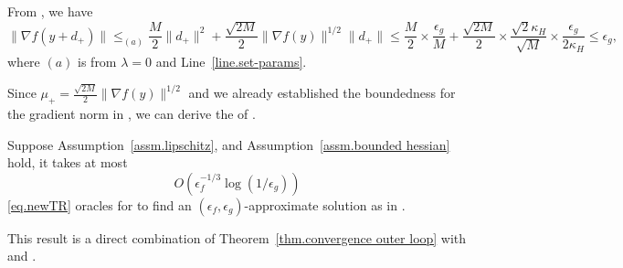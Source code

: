 \documentclass[moor,sglanonrev]{informs4}
\begin{document}
From , we have
\begin{equation*}
    \|\nabla f(y+d_+)\| \leq_{(a)} \frac{M}{2}\|d_+\|^2 + \frac{\sqrt{2M}}{2}\|\nabla f(y)\|^{1/2}\|d_+\|   \leq \frac{M}{2}\times \frac{\epsilon_g}{M}+\frac{\sqrt{2M}}{2}\times\frac{\sqrt{2}\kappa_H}{\sqrt{M}}\times\frac{\epsilon_g}{2\kappa_H}  \leq \epsilon_g,
\end{equation*}
{\color{red} where $(a)$ is from $\lambda=0$ and Line~\ref{line.set-params}.}
\Halmos \endproof

Since $\mu_+ = \frac{\sqrt{2M}}{2}\|\nabla f(y)\|^{1/2}$ and we already established the boundedness for the gradient norm in , we can derive the  of .
\begin{theorem}
    \label{thm.total complexity newton}
    Suppose Assumption~\ref{assm.lipschitz},  and Assumption~\ref{assm.bounded hessian} hold, it takes at most
    \begin{equation}\label{eq.total complexity newton}
        O\left (\epsilon_f^{-1/3}\log \left(1/\epsilon_g\right)\right)
    \end{equation}
    \ref{eq.newTR} oracles for  to find an $(\epsilon_f,\epsilon_g)$-approximate solution as in .
\end{theorem}
This result is a direct combination of Theorem~\ref{thm.convergence outer loop} with  and .
\Halmos \endproof
\end{document}
